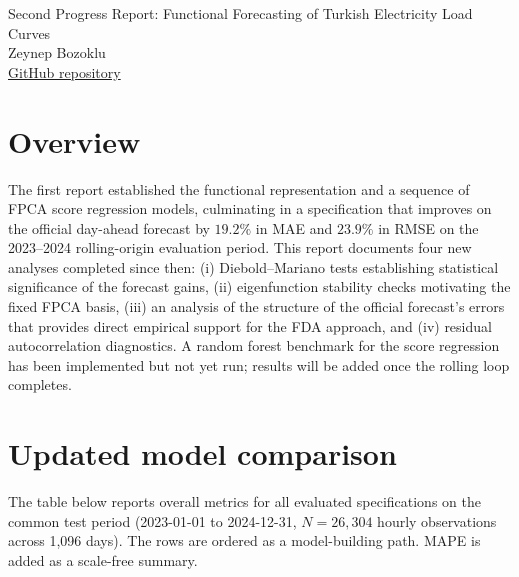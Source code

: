 \documentclass[10pt,a4paper]{article}
\begin{document}
\fontsize{9.2}{10.8}\selectfont

\begin{center}
{\Large Second Progress Report: Functional Forecasting of Turkish Electricity Load Curves}\\
\vspace{0.5em}
{\normalsize Zeynep Bozoklu}\\
\vspace{0.25em}
{\small \href{https://github.com/zebozoklu/turkey-electricity-fda}{GitHub repository}}
\end{center}

\vspace{-0.5em}

\section*{Overview}

The first report established the functional representation and a sequence of FPCA score regression models, culminating in a specification that improves on the official day-ahead forecast by \(19.2\%\) in MAE and \(23.9\%\) in RMSE on the 2023--2024 rolling-origin evaluation period. This report documents four new analyses completed since then: (i) Diebold--Mariano tests establishing statistical significance of the forecast gains, (ii) eigenfunction stability checks motivating the fixed FPCA basis, (iii) an analysis of the structure of the official forecast's errors that provides direct empirical support for the FDA approach, and (iv) residual autocorrelation diagnostics. A random forest benchmark for the score regression has been implemented but not yet run; results will be added once the rolling loop completes.

\section*{Updated model comparison}

The table below reports overall metrics for all evaluated specifications on the common test period (2023-01-01 to 2024-12-31, \(N = 26{,}304\) hourly observations across 1{,}096 days). The rows are ordered as a model-building path. MAPE is added as a scale-free summary.
\end{document}
